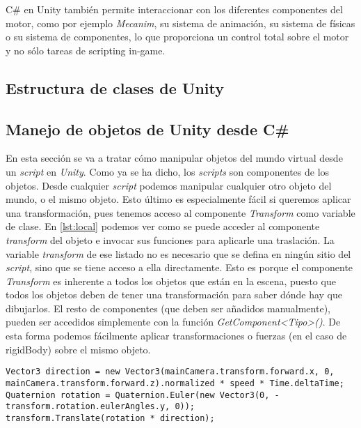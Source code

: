 \documentclass{pre-tfg}
\begin{document}
C\# en Unity también permite interaccionar con los diferentes componentes del motor, como por ejemplo \emph{Mecanim}, su sistema de animación, su sistema de físicas o su sistema de componentes, lo que proporciona un control total sobre el motor y no sólo tareas de scripting in-game.

\subsection{Estructura de clases de Unity}

\subsection{Manejo de objetos de Unity desde C\#}

En esta sección se va a tratar c\'omo manipular objetos del mundo virtual desde un \textit{script} en \textit{Unity}. Como ya se ha dicho, los \textit{scripts} son componentes de los objetos. Desde cualquier \textit{script} podemos manipular cualquier otro objeto del mundo, o el mismo objeto. Esto último es especialmente f\'acil si queremos aplicar una transformación, pues tenemos acceso al componente \textit{Transform} como variable de clase. En \ref{lst:local} podemos ver como se puede acceder al componente \textit{transform} del objeto e invocar sus funciones para aplicarle una traslación. La variable \textit{transform} de ese listado no es necesario que se defina en ningún sitio del \textit{script}, sino que se tiene acceso a ella directamente. Esto es porque el componente \textit{Transform} es inherente a todos los objetos que están en la escena, puesto que todos los objetos deben de tener una transformación para saber dónde hay que dibujarlos. El resto de componentes (que deben ser añadidos manualmente), pueden ser accedidos simplemente con la función \textit{GetComponent<Tipo>()}. De esta forma podemos fácilmente aplicar transformaciones o fuerzas (en el caso de rigidBody) sobre el mismo objeto.

\begin{spacing}{1}
\begin{lstlisting}[float=htbp, caption={Acceso al componente transform para modificar el propio objeto}, label=lst:local]
Vector3 direction = new Vector3(mainCamera.transform.forward.x, 0, mainCamera.transform.forward.z).normalized * speed * Time.deltaTime;
Quaternion rotation = Quaternion.Euler(new Vector3(0, -transform.rotation.eulerAngles.y, 0));
transform.Translate(rotation * direction);
\end{lstlisting}
\end{spacing}
\end{document}
